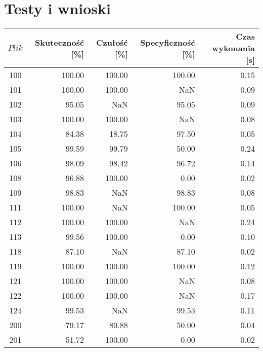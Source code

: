 \section{Testy i wnioski}
\label{sec_testy}

\begin{table}
	\centering
	\begin{tabular}{|c|r|r|r|r|}
		\hline
		$Plik$ & Skuteczność [\%] & Czułość [\%] & Specyficzność [\%] & Czas wykonania [s] \\
		\hline
		100 & 100.00     & 100.00     & 100.00     & 0.15       \\
		\hline
		101 & 100.00     & 100.00     & NaN        & 0.09       \\
		\hline
		102 & 95.05      & NaN        & 95.05      & 0.09       \\
		\hline
		103 & 100.00     & 100.00     & NaN        & 0.08       \\
		\hline
		104 & 84.38      & 18.75      & 97.50      & 0.05       \\
		\hline
		105 & 99.59      & 99.79      & 50.00      & 0.24       \\
		\hline
		106 & 98.09      & 98.42      & 96.72      & 0.14       \\
		\hline
		108 & 96.88      & 100.00     & 0.00       & 0.02       \\
		\hline
		109 & 98.83      & NaN        & 98.83      & 0.08       \\
		\hline
		111 & 100.00     & NaN        & 100.00     & 0.05       \\
		\hline
		112 & 100.00     & 100.00     & NaN        & 0.24       \\
		\hline
		113 & 99.56      & 100.00     & 0.00       & 0.10       \\
		\hline
		118 & 87.10      & NaN        & 87.10      & 0.02       \\
		\hline
		119 & 100.00     & 100.00     & 100.00     & 0.12       \\
		\hline
		121 & 100.00     & 100.00     & NaN        & 0.08       \\
		\hline
		122 & 100.00     & 100.00     & NaN        & 0.17       \\
		\hline
		124 & 99.53      & NaN        & 99.53      & 0.11       \\
		\hline
		200 & 79.17      & 80.88      & 50.00      & 0.04       \\
		\hline
		201 & 51.72      & 100.00     & 0.00       & 0.02       \\

\end{tabular}
\end{table}
